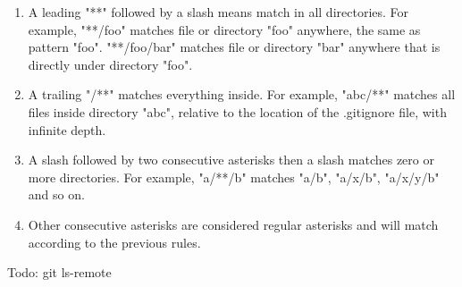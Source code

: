 \documentclass{charuun}
\begin{document}
\begin{enumerate}
\item A leading "**" followed by a slash means match in all directories. For example, "**/foo" matches file or directory "foo" anywhere, the same as pattern "foo". "**/foo/bar" matches file or directory "bar" anywhere that is directly under directory "foo".
\item A trailing "/**" matches everything inside. For example, "abc/**" matches all files inside directory "abc", relative to the location of the .gitignore file, with infinite depth.
\item A slash followed by two consecutive asterisks then a slash matches zero or more directories. For example, "a/**/b" matches "a/b", "a/x/b", "a/x/y/b" and so on.
\item Other consecutive asterisks are considered regular asterisks and will match according to the previous rules.
\end{enumerate}

Todo: git ls-remote
\end{document}
